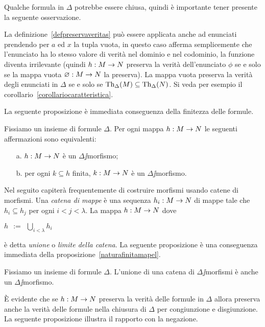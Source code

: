 Qualche formula in $\Delta$ potrebbe essere chiusa, quindi \`e importante tener presente la seguente osservazione.

\begin{remark}
La definizione~\ref{defpreservaveritas} pu\`o essere applicata anche ad enunciati prendendo per $a$ ed $x$ la tupla vuota, in questo caso afferma semplicemente che l'enunciato ha lo stesso valore di verit\`a nel dominio e nel codominio, la funzione diventa irrilevante (quindi $h:M\rightarrow N$ preserva la verit\`a dell'enunciato $\phi$ se e solo se la mappa vuota $\varnothing:M\rightarrow N$ la preserva). La mappa vuota preserva la verit\`a degli enunciati in $\Delta$ se e solo se $\textrm{Th}_\Delta(M)\subseteq\textrm{Th}_\Delta(N)$. Si veda per esempio il corollario~\ref{corollariocaratteristica}.\QED
\end{remark}

La seguente proposizione \`e immediata conseguenza della finitezza delle formule.

\begin{proposition}\label{naturafinitamapel}
Fissiamo un insieme di formule $\Delta$. Per ogni mappa $h:M\rightarrow N$ le seguenti affermazioni sono equivalenti:
\begin{itemize}
\item[a.] $h:M\rightarrow N$ \`e un $\Delta\jj$morfismo;
\item[b.] per ogni $k\subseteq h$ finita, $k:M\rightarrow N$ \`e un $\Delta\jj$morfismo.\QED
\end{itemize}
\end{proposition}

Nel seguito capiter\`a frequentemente di costruire morfismi usando catene di morfismi. Una \emph{catena di mappe\/} \`e una sequenza $h_i:M\rightarrow N$ di mappe tale che  $h_i\subseteq h_{j}$ per ogni $i<j<\lambda$. La mappa $h:M\rightarrow N$ dove 

\hfil$\displaystyle h\ \ :=\ \ \bigcup_{i<\lambda} h_i$

\`e detta \emph{unione\/} o \emph{limite della catena}. La seguente proposizione \`e una conseguenza immediata della proposizione~\ref{naturafinitamapel}.

\begin{proposition}
\label{cateneisomorfismiparziali}
Fissiamo un insieme di formule $\Delta$. L'unione di una catena di $\Delta\jj$morfismi \`e anche un $\Delta\jj$morfismo.\QED
\end{proposition}

\`E evidente che se $h:M\rightarrow N$ preserva la verit\`a delle formule in $\Delta$ allora preserva anche la verit\`a delle formule nella chiusura di $\Delta$ per congiunzione e disgiunzione. La seguente proposizione illustra il rapporto con la negazione.

